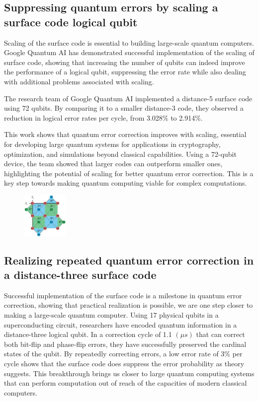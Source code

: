 \subsection{Suppressing quantum errors by scaling a surface code logical qubit}

Scaling of the surface code is essential to building large-scale quantum computers. Google Quantum AI has demonstrated successful implementation of the scaling of surface code, showing that increasing the number of qubits can indeed improve the performance of a logical qubit, suppressing the error rate while also dealing with additional problems associated with scaling.

The research team of Google Quantum AI implemented a distance-5 surface code using 72 qubits. By comparing it to a smaller distance-3 code, they observed a reduction in logical error rates per cycle, from 3.028\% to 2.914\%.

This work shows that quantum error correction improves with scaling, essential for developing large quantum systems for applications in cryptography, optimization, and simulations beyond classical capabilities. Using a 72-qubit device, the team showed that larger codes can outperform smaller ones, highlighting the potential of scaling for better quantum error correction. This is a key step towards making quantum computing viable for complex computations.

\begin{figure}[h]
    \centering
    \includegraphics[width=0.2\textwidth]{sections/5_practical_implementation/representation.png}
    \caption{}
\end{figure}

\subsection{Realizing repeated quantum error correction in a distance-three surface code}
Successful implementation of the surface code is a milestone in quantum error correction, showing that practical realization is possible, we are one step closer to making a large-scale quantum computer. Using 17 physical qubits in a superconducting circuit, researchers have encoded quantum information in a distance-three logical qubit. In a correction cycle of 1.1 $(\mu s)$ that can correct both bit-flip and phase-flip errors, they have successfully preserved the cardinal states of the qubit. By repeatedly correcting errors, a low error rate of 3\% per cycle shows that the surface code does suppress the error probability as theory suggests. This breakthrough brings us closer to large quantum computing systems that can perform computation out of reach of the capacities of modern classical computers.

